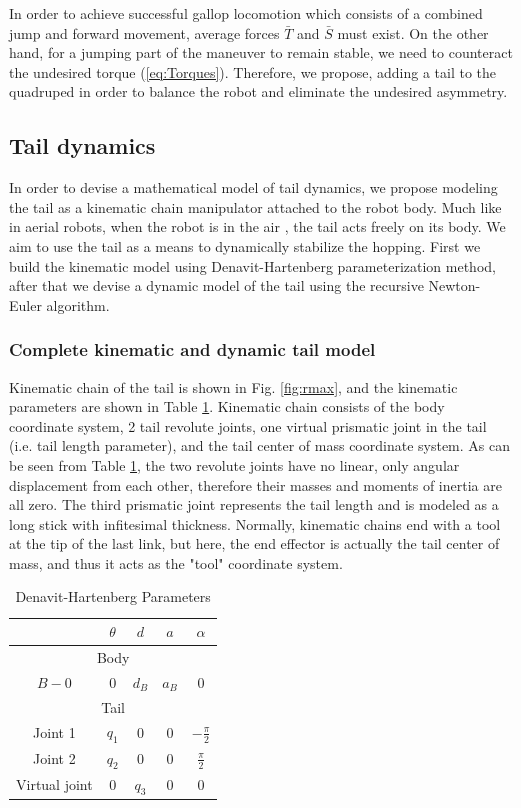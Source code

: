 In order to achieve successful gallop locomotion which consists of a combined jump and forward movement, average forces $\bar{T}$ and $\bar{S}$ must exist. On the other hand, for a jumping part of the maneuver to remain stable, we need to counteract the undesired torque (\ref{eq:Torques}). Therefore, we propose, adding a tail to the quadruped in order to balance the robot and eliminate the undesired asymmetry. 

\subsection{Tail dynamics}
In order to devise a mathematical model of tail dynamics, we propose modeling the tail as a kinematic chain manipulator attached to the robot body. Much like in aerial robots, when the robot is in the air \cite{Korpela2013ICRA,Orsag2012JINT}, the tail acts freely on its body. We aim to use the tail as a means to dynamically stabilize the hopping. First we build the kinematic model using Denavit-Hartenberg parameterization method, after that we devise a dynamic model of the tail using the recursive Newton-Euler algorithm.
\subsubsection{Complete kinematic and dynamic tail model}
Kinematic chain of the tail is shown in Fig. \ref{fig:rmax}, and the kinematic parameters are shown in Table \ref{tab:DHParameters}. Kinematic chain consists of the body coordinate system, 2 tail revolute joints, one virtual prismatic joint in the tail (i.e. tail length parameter), and the tail center of mass coordinate system. As can be seen from Table \ref{tab:DHParameters}, the two revolute joints have no linear, only angular displacement from each other, therefore their masses and moments of inertia are all zero. The third prismatic joint represents the tail length and is modeled as a long stick with infitesimal thickness. Normally, kinematic chains end with a tool at the tip of the last link, but here, the end effector is actually the tail center of mass, and thus it acts as the "tool" coordinate system.

\begin{table}
	\centering
		\begin{tabular}{ccccc}
		\hline
			& $\theta$ & $d$ & $a$ & $\alpha$ \\\hline
			\multicolumn{5}{c}{Body}\\\hline
			$B-0$ & $0$ & $d_B$ & $a_B$ & $0$\\\hline
			\multicolumn{5}{c}{Tail}\\\hline
			Joint 1 & $q_1$ & $0$ & $0$ & $-\frac{\pi}{2}$\\
			Joint 2 & $q_2$ & $0$ & $0$ & $\frac{\pi}{2}$\\
			Virtual joint& $0$ & $q_3$ & $0$ & $0$\\\hline
		\end{tabular}
	\caption{Denavit-Hartenberg Parameters}\label{tab:DHParameters}
\end{table}

